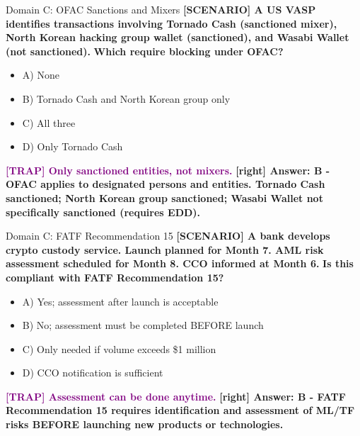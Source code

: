 \documentclass[11pt,a4paper]{beamer}
\newcommand{\trap}[1]{\textcolor{purple}{\textbf{[TRAP] #1}}}
\newcommand{\correct}[1]{\textcolor{green!50!black}{\textbf{[right] #1}}}
\newcommand{\scenario}[1]{\textcolor{blue!70!black}{\textbf{[SCENARIO] #1}}}
\begin{document}
\begin{frame}{Domain C: OFAC Sanctions and Mixers}
\scenario{A US VASP identifies transactions involving Tornado Cash (sanctioned mixer), North Korean hacking group wallet (sanctioned), and Wasabi Wallet (not sanctioned).}
\vspace{0.2cm}
\textbf{Which require blocking under OFAC?}
\vspace{0.2cm}
\begin{itemize}
    \item A) None
    \item B) Tornado Cash and North Korean group only
    \item C) All three
    \item D) Only Tornado Cash
\end{itemize}
\vspace{0.2cm}
\trap{Only sanctioned entities, not mixers.}
\correct{Answer: B - OFAC applies to designated persons and entities. Tornado Cash sanctioned; North Korean group sanctioned; Wasabi Wallet not specifically sanctioned (requires EDD).}
\end{frame}

\begin{frame}{Domain C: FATF Recommendation 15}
\scenario{A bank develops crypto custody service. Launch planned for Month 7. AML risk assessment scheduled for Month 8. CCO informed at Month 6.}
\vspace{0.2cm}
\textbf{Is this compliant with FATF Recommendation 15?}
\vspace{0.2cm}
\begin{itemize}
    \item A) Yes; assessment after launch is acceptable
    \item B) No; assessment must be completed BEFORE launch
    \item C) Only needed if volume exceeds \$1 million
    \item D) CCO notification is sufficient
\end{itemize}
\vspace{0.2cm}
\trap{Assessment can be done anytime.}
\correct{Answer: B - FATF Recommendation 15 requires identification and assessment of ML/TF risks BEFORE launching new products or technologies.}
\end{frame}
\end{document}
